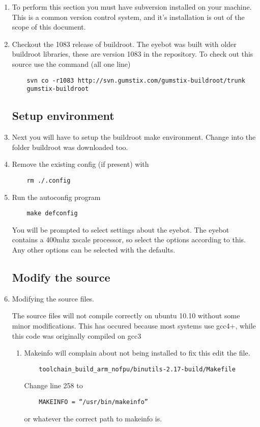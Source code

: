 \begin{enumerate}
	\item To perform this section you must have subversion installed on your machine. This is a common version control system, and it's installation is out of the scope of this document.
	\item Checkout the 1083 release of buildroot. The eyebot was built with older buildroot libraries, these are version 1083 in the repository. To check out this source use the command (all one line)

\begin{verbatim}
	svn co -r1083 http://svn.gumstix.com/gumstix-buildroot/trunk 
	gumstix-buildroot
\end{verbatim}

\subsection{Setup environment}

	\item Next you will have to setup the buildroot make environment. Change into the folder buildroot was downloaded too.
	\item Remove the existing config (if present) with

\begin{verbatim}
	rm ./.config
\end{verbatim}

	\item Run the autoconfig program

\begin{verbatim}
	make defconfig
\end{verbatim}

	You will be prompted to select settings about the eyebot. The eyebot contains a 400mhz xscale processor, so select the options according to this. Any other options can be selected with the defaults.

\subsection{Modify the source}
	\item Modifying the source files.

	The source files will not compile correctly on ubuntu 10.10 without some minor modifications. This has occured because most systems use gcc4+, while this code was originally compiled on gcc3

\begin{enumerate}
	\item Makeinfo will complain about not being installed to fix this edit the file. 
\begin{verbatim}
	toolchain_build_arm_nofpu/binutils-2.17-build/Makefile 
\end{verbatim}
	Change line 258 to 
\begin{verbatim}
	MAKEINFO = “/usr/bin/makeinfo”
\end{verbatim}
	or whatever the correct path to makeinfo is.


\end{enumerate}
\end{enumerate}
